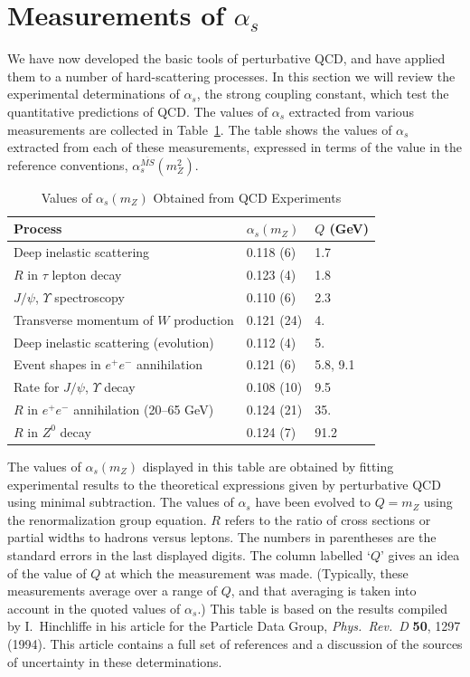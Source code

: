 \section{Measurements of $\alpha_s$}

We have now developed the basic tools of perturbative QCD, and have applied
them to a number of hard-scattering processes.  In this section we will
review the experimental determinations of $\alpha_s$, the strong coupling
constant, which test the quantitative predictions of QCD.  The values of
$\alpha_s$ extracted from various measurements are collected in
Table~\ref{tab:17.1}.  The table shows the values of $\alpha_s$ extracted
from each of these measurements, expressed in terms of the value in the
reference conventions, $\alpha_s^{\overline{MS}}(m_Z^2)$.

\begin{table}[t]
  \centering
  \caption{Values of $\alpha_s(m_Z)$ Obtained from QCD Experiments}
  \begin{tabular}{lll}
    \toprule
    Process & $\alpha_s(m_Z)$ & $Q$ (GeV)\\
    \midrule
    Deep inelastic scattering & 0.118 (6) & 1.7\\
    $R$ in $\tau$ lepton decay & 0.123 (4) & 1.8\\
    $J/\psi$, $\Upsilon$ spectroscopy & 0.110 (6) & 2.3\\
    Transverse momentum of $W$ production & 0.121 (24) & 4.\\
    Deep inelastic scattering (evolution) & 0.112 (4) & 5.\\
    Event shapes in $e^{+}e^{-}$ annihilation & 0.121 (6) & 5.8, 9.1\\
    Rate for $J/\psi$, $\Upsilon$ decay & 0.108 (10) & 9.5\\
    $R$ in $e^{+}e^{-}$ annihilation (20--65 GeV) & 0.124 (21) & 35.\\
    $R$ in $Z^0$ decay & 0.124 (7) & 91.2\\
    \bottomrule
  \end{tabular}
  \label{tab:17.1}
\end{table}

The values of $\alpha_s(m_Z)$ displayed in this table are obtained by fitting
experimental results to the theoretical expressions given by perturbative QCD
using minimal subtraction.  The values of $\alpha_s$ have been evolved to
$Q = m_Z$ using the renormalization group equation.  $R$ refers to the ratio
of cross sections or partial widths to hadrons versus leptons.  The numbers
in parentheses are the standard errors in the last displayed digits.  The
column labelled `$Q$' gives an idea of the value of $Q$ at which the
measurement was made.  (Typically, these measurements average over a range
of $Q$, and that averaging is taken into account in the quoted values of
$\alpha_s$.)  This table is based on the results compiled by I.~Hinchliffe in
his article for the Particle Data Group, \emph{Phys.\ Rev.\ D} \textbf{50},
1297 (1994).  This article contains a full set of references and a discussion
of the sources of uncertainty in these determinations.

